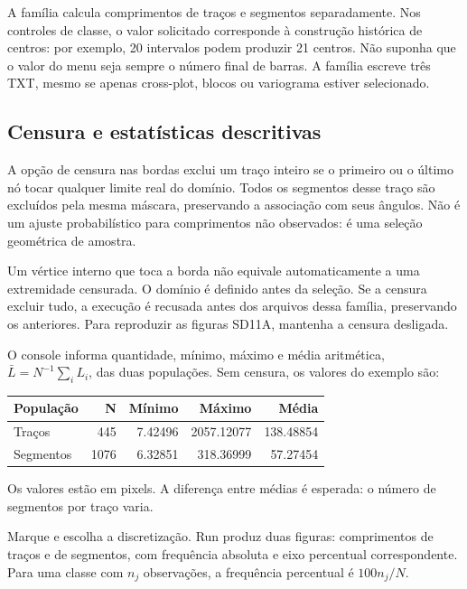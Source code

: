\label{sec:lengths}
A família calcula comprimentos de traços e segmentos separadamente. Nos controles de classe, o valor solicitado corresponde à construção histórica de centros: por exemplo, 20 intervalos podem produzir 21 centros. Não suponha que o valor do menu seja sempre o número final de barras. A família escreve três TXT, mesmo se apenas cross-plot, blocos ou variograma estiver selecionado.

\subsection{Censura e estatísticas descritivas}
A opção de censura nas bordas exclui um traço inteiro se o primeiro ou o último nó tocar qualquer limite real do domínio. Todos os segmentos desse traço são excluídos pela mesma máscara, preservando a associação com seus ângulos. Não é um ajuste probabilístico para comprimentos não observados: é uma seleção geométrica de amostra.

Um vértice interno que toca a borda não equivale automaticamente a uma extremidade censurada. O domínio é definido antes da seleção. Se a censura excluir tudo, a execução é recusada antes dos arquivos dessa família, preservando os anteriores. Para reproduzir as figuras SD11A, mantenha a censura desligada.

O console informa quantidade, mínimo, máximo e média aritmética,
\(\bar L=N^{-1}\sum_i L_i\), das duas populações. Sem censura, os valores do exemplo são:
\begin{center}\begin{tabular}{@{}lrrrr@{}}\toprule
População & N & Mínimo & Máximo & Média\\\midrule
Traços &445&7.42496&2057.12077&138.48854\\
Segmentos &1076&6.32851&318.36999&57.27454\\\bottomrule
\end{tabular}\end{center}
Os valores estão em pixels. A diferença entre médias é esperada: o número de segmentos por traço varia.

Marque  e escolha a discretização. Run produz duas figuras: comprimentos de traços e de segmentos, com frequência absoluta e eixo percentual correspondente. Para uma classe com \(n_j\) observações, a frequência percentual é \(100n_j/N\).


